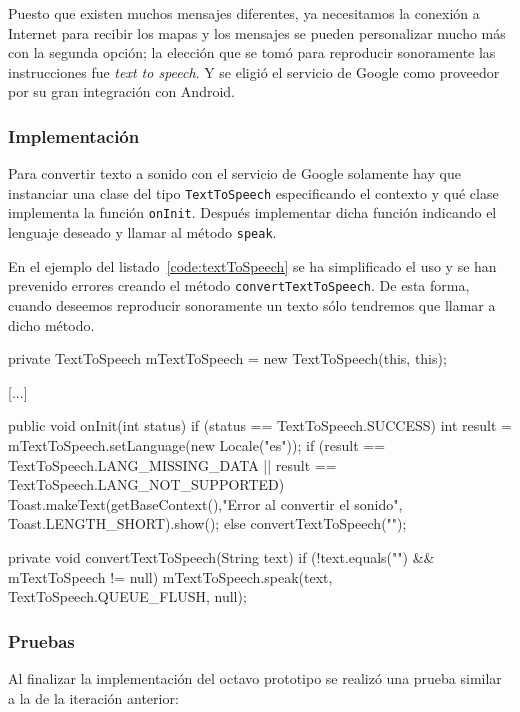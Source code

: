 Puesto que existen muchos mensajes diferentes, ya necesitamos la conexión a Internet para recibir
los mapas y los mensajes se pueden personalizar mucho más con la segunda opción; la elección que se
tomó para reproducir sonoramente las instrucciones fue \emph{text to speech}. Y se eligió el
servicio de Google como proveedor por su gran integración con Android.

\subsubsection{Implementación}

Para convertir texto a sonido con el servicio de Google solamente hay que instanciar una clase del
tipo \texttt{TextToSpeech} especificando el contexto y qué clase implementa la función
\texttt{onInit}. Después implementar dicha función indicando el lenguaje deseado y llamar al método
\texttt{speak}.

En el ejemplo del listado~\ref{code:textToSpeech} se ha simplificado el uso y se han prevenido
errores creando el método \texttt{convertTextToSpeech}. De esta forma, cuando deseemos reproducir
sonoramente un texto sólo tendremos que llamar a dicho método.

\begin{listing}[
  language = java,
  caption  = {Ejemplo del uso de \texttt{TextToSpeech}},
  label    = code:textToSpeech]
private TextToSpeech mTextToSpeech = new TextToSpeech(this, this);

[...]

public void onInit(int status) {
  if (status == TextToSpeech.SUCCESS) {
    int result = mTextToSpeech.setLanguage(new Locale("es"));
    if (result == TextToSpeech.LANG_MISSING_DATA || 
        result == TextToSpeech.LANG_NOT_SUPPORTED) {
      Toast.makeText(getBaseContext(),"Error al convertir el sonido", Toast.LENGTH_SHORT).show();
    } else {
      convertTextToSpeech("");
    }
  } 
}

private void convertTextToSpeech(String text) {
  if (!text.equals("") && mTextToSpeech != null) {
    mTextToSpeech.speak(text, TextToSpeech.QUEUE_FLUSH, null);
  }
}
\end{listing}
\subsubsection{Pruebas}

Al finalizar la implementación del octavo prototipo se realizó una prueba similar a la de la
iteración anterior:

